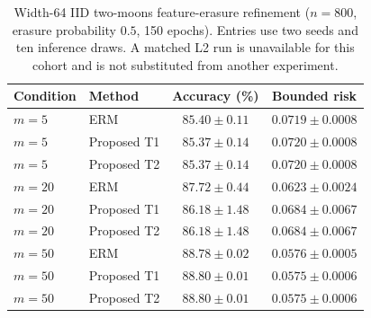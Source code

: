 \begin{table}[t]
\centering\footnotesize
\caption{Width-64 IID two-moons feature-erasure refinement ($n=800$, erasure probability $0.5$, 150 epochs). Entries use two seeds and ten inference draws. A matched L2 run is unavailable for this cohort and is not substituted from another experiment.}
\label{tab:app_toy_erasure}
\begin{tabular}{llcc}
\toprule
Condition & Method & Accuracy (\%) & Bounded risk\\
\midrule
$m=5$ & ERM & $\mathbf{85.40\pm0.11}$ & $\mathbf{0.0719\pm0.0008}$\\
$m=5$ & Proposed T1 & $85.37\pm0.14$ & $0.0720\pm0.0008$\\
$m=5$ & Proposed T2 & $85.37\pm0.14$ & $0.0720\pm0.0008$\\
\addlinespace
$m=20$ & ERM & $\mathbf{87.72\pm0.44}$ & $\mathbf{0.0623\pm0.0024}$\\
$m=20$ & Proposed T1 & $86.18\pm1.48$ & $0.0684\pm0.0067$\\
$m=20$ & Proposed T2 & $86.18\pm1.48$ & $0.0684\pm0.0067$\\
\addlinespace
$m=50$ & ERM & $88.78\pm0.02$ & $0.0576\pm0.0005$\\
$m=50$ & Proposed T1 & $88.80\pm0.01$ & $0.0575\pm0.0006$\\
$m=50$ & Proposed T2 & $\mathbf{88.80\pm0.01}$ & $\mathbf{0.0575\pm0.0006}$\\
\bottomrule
\end{tabular}
\end{table}
